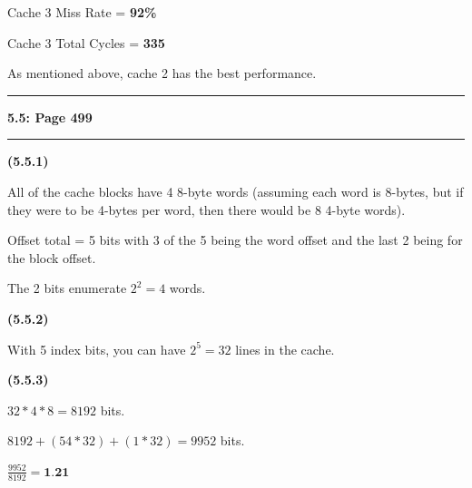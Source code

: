\documentclass[11pt]{article}
\newcommand\question[2]{\vspace{.25in}\hrule\textbf{#1: #2}\vspace{.5em}\hrule\vspace{.10in}}
\renewcommand\part[1]{\vspace{.10in}\textbf{(#1)}\par}
\begin{document}
		Cache 3 Miss Rate = \textbf{92\%}\par
		Cache 3 Total Cycles = \textbf{335}\par
		As mentioned above, cache 2 has the best performance.\par
		
		
\question{5.5}{Page 499} %

	\part{5.5.1}
		All of the cache blocks have 4 8-byte words (assuming each word is 8-bytes, but if they were to be 4-bytes per word, then there would be 8 4-byte words).\par
		Offset total =  5 bits with 3 of the 5 being the word offset and the last 2 being for the block offset.\par
		The 2 bits enumerate $2^{2}=4$ words.\par
	
	\part{5.5.2}
		With 5 index bits, you can have $2^{5} = 32$ lines in the cache.\par
	
	\part{5.5.3}
		$32 * 4 * 8 = 8192$ bits.\par
		$8192 + (54*32) + (1 * 32)=9952$ bits.\par
		$\frac{9952}{8192}=\textbf{1.21}$\par
	
\end{document}
